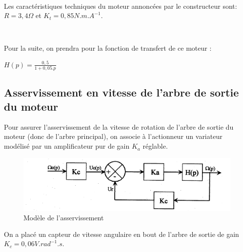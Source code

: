 
~\

Les caractéristiques techniques du moteur annoncées par le constructeur sont:\\
$R=3,4\Omega$ et $K_t=0,85N.m.A^{-1}$.



~\

Pour la suite, on prendra pour la fonction de transfert de ce moteur :
\begin{center}
$H(p)=\frac{0,5}{1+0,05.p}$
\end{center}

\subsection{Asservissement en vitesse de l'arbre de sortie du moteur}

Pour assurer l'asservissement de la vitesse de rotation de l'arbre de sortie du moteur (donc de l'arbre principal), on associe à l'actionneur un variateur modélisé par un amplificateur pur de gain $K_a$ réglable.

\begin{figure}[!h]
\begin{center}
	\includegraphics[width=0.7\linewidth]{img/fig05b}
\end{center}
\caption{Modèle de l'asservissement}
\label{fig05b}
\end{figure} 

On a placé un capteur de vitesse angulaire en bout de l'arbre de sortie de gain $K_c=0,06V.rad^{-1}.s$.
 
\newpage


